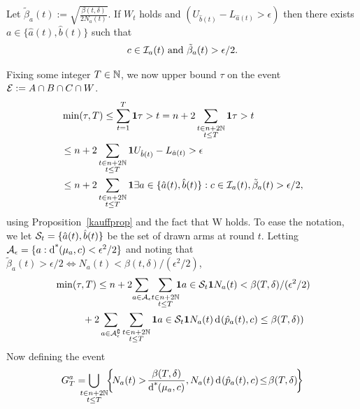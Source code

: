 \begin{proposition}\label{kauffprop}Let
$\tilde{\beta}_a(t) := \sqrt{ \frac{\beta(t,\delta)}{2 N_a(t)} }$. If $W_t$ holds and $(U_{\hat{b}(t)} - L_{\hat{a}(t)}>\epsilon)$ then there exists $a\in \{\hat{a}(t),\hat{b}(t)\}$ such that
\begin{align}
c \in \mathcal{I}_{a}(t) \text{ and } \tilde{\beta}_a(t) > {\epsilon}/{2}.
\end{align}
\end{proposition}
%
Fixing some integer $T \in \mathbb{N}$, we now upper bound $\tau$ on the event $\mathcal{E} := A\cap B\cap C\cap W$.
\begin{align*}
& \min(\tau,T)   \le  \sum_{t=1}^T\mathbf{1}{\tau > t} = n + 2\sum_{\substack{t  \in n + 2\mathbb{N}\\t \leq T}}\mathbf{1}{\tau > t} \\
& \leq  n + 2\sum_{\substack{t  \in n + 2\mathbb{N}\\t \leq T}}\mathbf{1}{U_{\hat{b}(t)} - L_{\hat{a}(t)} > \epsilon} \\
& \leq  n + 2\sum_{\substack{t  \in n + 2\mathbb{N}\\t \leq T}}\mathbf{1}{\exists a \in \{\hat{a}(t),\hat{b}(t)\}: c \in \mathcal{I}_{a}(t), \tilde{\beta}_a(t) > \epsilon/2},
\end{align*}
using Proposition~\ref{kauffprop} and the fact that W holds. To ease the notation, we let $\mathcal{S}_{t} = \{\hat{a}(t),\hat{b}(t)\}$ be the set of drawn arms at round $t$. Letting $\EpsCheapArms=\Set{a : \ArmCI{\ArmMean_a}{c} < \epsilon^2/2}$ and noting that $\tilde{\beta}_a(t) > \epsilon/2 \iff N_a(t) <
\beta(t,\delta)/(\epsilon^2/2)$, 
\begin{align*}
& \min(\tau,T)   \le  n + 2\!\sum_{a \in \mathcal{A}_{\epsilon}}\!\sum_{\substack{t  \in n + 2\mathbb{N}\\t \leq T}}\!\!\! \mathbf{1}{a \in \mathcal{S}_{t}}\mathbf{1}{N_a(t) < \beta(T,\delta)/(\epsilon^2/2)}\\
&  \hspace{1cm}+ 2\sum_{a \in \mathcal{A}_{\epsilon}^\complement} \sum_{\substack{t  \in n + 2\mathbb{N}\\t \leq T}} \mathbf{1}{a \in \mathcal{S}_{t}}\mathbf{1}{N_a(t)\operatorname{d}\hspace{-.1em}\left( \hat{p}_a(t), c \right) \leq \beta(T,\delta))}
\end{align*}
Now defining the event
\begin{align*}
G_T^a = \!\!\!\!\!\bigcup_{\substack{t  \in n + 2\N\\t \leq T}}\!\! \left\{\!N_a(t) > \! \frac{\beta(T,\delta)}{\ArmCI{\ArmMean_a}{c}} , N_a(t)\ArmKL{\hat{p}_a(t)}{c} \! \leq\!  \beta(T,\delta) \!\right\}
\end{align*}
